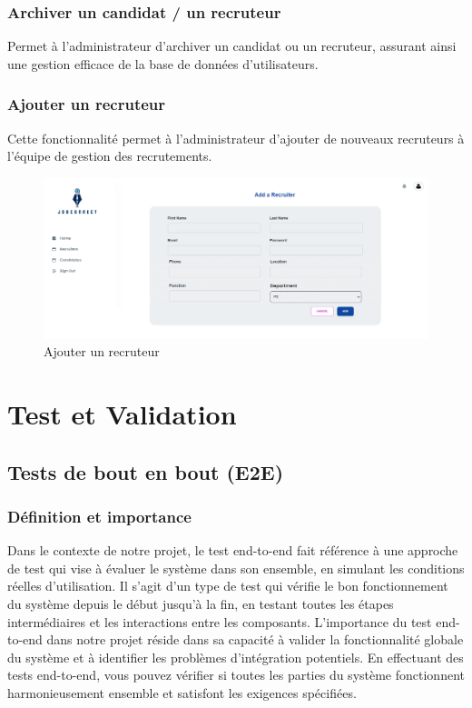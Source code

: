 \subsubsection{Archiver un candidat / un recruteur}

Permet à l'administrateur d'archiver un candidat ou un recruteur, assurant ainsi une gestion efficace de la base de données d'utilisateurs.


\subsubsection{Ajouter un recruteur}

Cette fonctionnalité permet à l'administrateur d'ajouter de nouveaux recruteurs à l'équipe de gestion des recrutements.
\begin{figure}[htbp]
   \centering
   \includegraphics[scale=0.2]{screens/addRecruiter.png} 
   \caption{Ajouter un recruteur}
   \label{fig:addRec}
\end{figure}




\section{Test et Validation}

\subsection{Tests de bout en bout (E2E)}
\subsubsection{Définition et importance}

Dans le contexte de notre projet, le test end-to-end fait référence à une approche de test qui vise à évaluer le système dans son ensemble, en simulant les conditions réelles d’utilisation. Il s’agit d’un type de test qui vérifie le bon fonctionnement du système depuis le début jusqu’à la fin, en testant toutes les étapes intermédiaires et les  interactions entre les  composants. L’importance du test end-to-end dans notre projet réside dans sa capacité  à valider  la fonctionnalité globale du système et à identifier les problèmes d’intégration potentiels. En effectuant des tests end-to-end, vous pouvez vérifier si toutes les parties du système fonctionnent harmonieusement ensemble et satisfont les exigences spécifiées.
\newline

